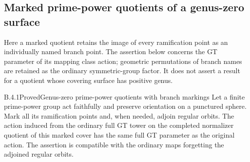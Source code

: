 \subsection{Marked prime-power quotients of a genus-zero surface}

Here a marked quotient retains the image of every ramification
point as an individually named branch point.  The assertion
below concerns the GT parameter of its mapping class action;
geometric permutations of branch names are retained as the
ordinary symmetric-group factor.  It does not assert a result
for a quotient whose covering surface has positive genus.

\begin{result}{B.4.1}{Proved}{Genus-zero prime-power quotients with branch markings}
Let a finite prime-power group act faithfully and preserve
orientation on a punctured sphere.  Mark all its ramification
points and, when needed, adjoin regular orbits.  The action
induced from the ordinary full GT tower on the completed
normalizer quotient of this marked cover has the same full GT
parameter as the original action.  The assertion is compatible
with the ordinary maps forgetting the adjoined regular orbits.
\end{result}
